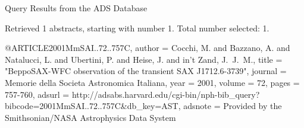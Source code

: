 Query Results from the ADS Database


Retrieved 1 abstracts, starting with number 1.  Total number selected: 1.

@ARTICLE{2001MmSAI..72..757C,
   author = {{Cocchi}, M. and {Bazzano}, A. and {Natalucci}, L. and {Ubertini}, P. and 
	{Heise}, J. and {in't Zand}, J.~J.~M.},
    title = "{BeppoSAX-WFC observation of the transient SAX J1712.6-3739}",
  journal = {Memorie della Societa Astronomica Italiana},
     year = 2001,
   volume = 72,
    pages = {757-760},
   adsurl = {http://adsabs.harvard.edu/cgi-bin/nph-bib_query?bibcode=2001MmSAI..72..757C&db_key=AST},
  adsnote = {Provided by the Smithsonian/NASA Astrophysics Data System}
}


